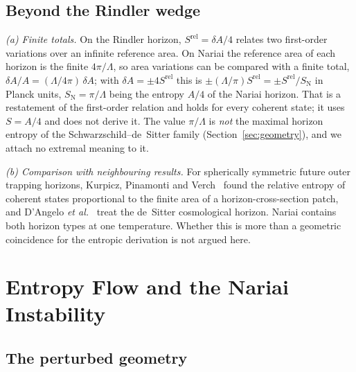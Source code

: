 \documentclass[11pt]{article}
\newcommand{\Srel}{S^{\mathrm{rel}}}
\newcommand{\Nariai}{Nariai}
\begin{document}
\subsection{Beyond the Rindler wedge}

\emph{(a) Finite totals.} On the Rindler horizon, $\Srel=\delta A/4$ relates two first-order variations over an infinite reference area. On \Nariai{} the reference area of each horizon is the finite $4\pi/\Lambda$, so area variations can be compared with a finite total, $\delta A/A=(\Lambda/4\pi)\,\delta A$; with $\delta A=\pm4\Srel$ this is $\pm(\Lambda/\pi)\Srel=\pm\Srel/S_{\mathrm N}$ in Planck units, $S_{\mathrm N}=\pi/\Lambda$ being the entropy $A/4$ of the Nariai horizon. That is a restatement of the first-order relation and holds for every coherent state; it uses $S=A/4$ and does not derive it. The value $\pi/\Lambda$ is \emph{not} the maximal horizon entropy of the Schwarzschild--de~Sitter family (Section~\ref{sec:geometry}), and we attach no extremal meaning to it.

\emph{(b) Comparison with neighbouring results.} For spherically symmetric future outer trapping horizons, Kurpicz, Pinamonti and Verch~\cite{KPV} found the relative entropy of coherent states proportional to the finite area of a horizon-cross-section patch, and D'Angelo \emph{et al.}~\cite{DAngelo} treat the de~Sitter cosmological horizon. \Nariai{} contains both horizon types at one temperature. Whether this is more than a geometric coincidence for the entropic derivation is not argued here.

\section{Entropy Flow and the \Nariai{} Instability}
\label{sec:instability}

\subsection{The perturbed geometry}
\end{document}
